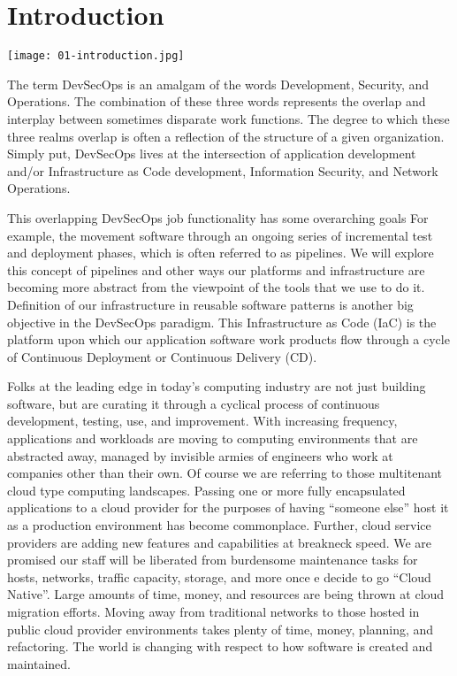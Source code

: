 \chapter{Introduction}

\centering
\texttt{[image: 01-introduction.jpg]}

\justifying
The term DevSecOps is an amalgam of the words Development, Security,
and Operations. The combination of these three words represents the overlap and
interplay between sometimes disparate work functions. The degree to
which these three realms overlap is often a reflection of the structure of a given
organization. Simply put, DevSecOps lives at the intersection of application development
and/or Infrastructure as Code development, Information Security, and Network Operations.

\justifying
This overlapping DevSecOps job functionality has some overarching goals For
example, the movement software through an ongoing series of incremental test and
deployment phases, which is often referred to as pipelines. We will
explore this concept of pipelines and other ways our platforms and infrastructure
are becoming more abstract from the viewpoint of the tools that we use to do it.
Definition of our infrastructure in reusable software patterns is another big objective
in the DevSecOps paradigm. This Infrastructure as Code
(IaC) is the platform
upon which our application software work products flow through a cycle of Continuous
Deployment or Continuous Delivery (CD).

\justifying
Folks at the leading edge in today's computing industry are not just building
software, but are curating it through a cyclical process of continuous development,
testing, use, and improvement. With increasing frequency, applications and
workloads are moving to computing environments that are abstracted away, managed
by invisible armies of engineers who work at companies other than their own. Of course
we are referring to those multitenant cloud type computing landscapes. Passing
one or more fully encapsulated applications to a cloud provider for the purposes
of having ``someone else'' host it as a production environment has become
commonplace. Further, cloud service providers are adding new features and capabilities
at breakneck speed. We are promised our staff will be liberated from burdensome
maintenance tasks for hosts, networks, traffic capacity, storage, and more once
e decide to go ``Cloud Native''. Large amounts of time,
money, and resources are being thrown at cloud migration efforts. Moving away
from traditional networks to those hosted in public
cloud provider environments takes plenty of time, money, planning, and refactoring.
The world is changing with respect to how software is created and maintained.

